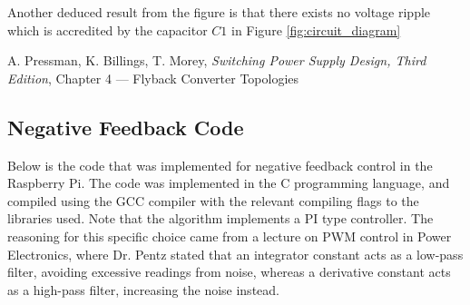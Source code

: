 \documentclass[a4paper, 12pt]{article}
\begin{document}
Another deduced result from the figure is that there exists no voltage ripple which is accredited by the capacitor $C1$ in Figure \ref{fig:circuit_diagram}  


\begin{thebibliography}{0}
	 A. Pressman, K. Billings, T. Morey, \textit{Switching Power Supply Design, Third Edition}, Chapter 4 --- Flyback Converter Topologies
\end{thebibliography}

\newpage
\begin{appendices}
	\section{Negative Feedback Code}
	\label{sec:feedback_code}
	Below is the code that was implemented for negative feedback control in
	the Raspberry Pi. The code was implemented in the C programming
	language, and compiled using the GCC compiler with the relevant
	compiling flags to the libraries used. Note that the algorithm
	implements a PI type controller. The reasoning for this specific choice
	came from a lecture on PWM control in Power Electronics, where Dr.
	Pentz stated that an integrator constant acts as a low-pass filter,
	avoiding excessive readings from noise, whereas a derivative constant
	acts as a high-pass filter, increasing the noise instead.
	

\end{appendices}
\end{document}
